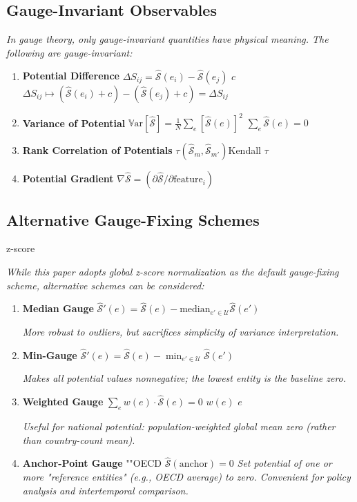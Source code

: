 \documentclass[11pt,a4paper]{article}
\theoremstyle{definition}
\newcommand{\Sop}{\hat{\mathcal{S}}}
\newcommand{\Var}{\mathbb{V}\text{ar}}
\newcommand{\universe}{\mathcal{U}}
\begin{document}
\subsection{ Gauge-Invariant Observables}



\medskip
\noindent\textit{In gauge theory, only gauge-invariant quantities have physical meaning. The following are gauge-invariant:}

\begin{enumerate}[leftmargin=*,label=\textbf{(\arabic*)}]
    \item \textbf{ Potential Difference}
    $\Delta S_{ij} = \Sop(e_i) - \Sop(e_j)$ $c$
    $\Delta S_{ij} \mapsto (\Sop(e_i) + c) - (\Sop(e_j) + c) = \Delta S_{ij}$
    
    \item \textbf{ Variance of Potential}
    $\Var[\Sop] = \frac{1}{N} \sum_e [\Sop(e)]^2$ $\sum_e \Sop(e) = 0$ 
    
    \item \textbf{ Rank Correlation of Potentials}
    $\tau(\Sop_m, \Sop_{m'})$Kendall $\tau$ 
    
    \item \textbf{ Potential Gradient}
    $\nabla \Sop = (\partial \Sop / \partial \text{feature}_i)$
\end{enumerate}

\subsection{ Alternative Gauge-Fixing Schemes}

z-score

\medskip
\noindent\textit{While this paper adopts global z-score normalization as the default gauge-fixing scheme, alternative schemes can be considered:}

\begin{enumerate}[leftmargin=*,label=\textbf{ \arabic*:}]
    \item \textbf{ Median Gauge}
    $\Sop'(e) = \Sop(e) - \text{median}_{e' \in \universe} \Sop(e')$
    
    \textit{More robust to outliers, but sacrifices simplicity of variance interpretation.}
    
    \item \textbf{ Min-Gauge}
    $\Sop'(e) = \Sop(e) - \min_{e' \in \universe} \Sop(e')$
    
    \textit{Makes all potential values nonnegative; the lowest entity is the baseline zero.}
    
    \item \textbf{ Weighted Gauge}
    $\sum_e w(e) \cdot \Sop(e) = 0$ $w(e)$  $e$ 
    
    \textit{Useful for national potential: population-weighted global mean zero (rather than country-count mean).}
    
    \item \textbf{ Anchor-Point Gauge}
    ""OECD
    $\Sop(\text{anchor}) = 0$
    \textit{Set potential of one or more "reference entities" (e.g., OECD average) to zero. Convenient for policy analysis and intertemporal comparison.}
\end{enumerate}
\end{document}
